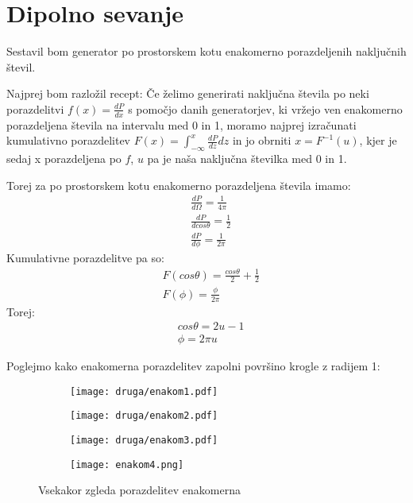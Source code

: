\documentclass{article}
\begin{document}
\section{Dipolno sevanje}

Sestavil bom generator po prostorskem kotu enakomerno porazdeljenih naključnih števil.


Najprej bom razložil recept: Če želimo generirati naključna števila po neki porazdelitvi $f(x) = \frac{dP}{dx}$ s pomočjo danih generatorjev, ki vržejo ven enakomerno porazdeljena števila na intervalu med 0 in 1, moramo najprej izračunati kumulativno porazdelitev $F(x) = \int_{-\infty}^x \frac{dP}{dz}dz$ in jo obrniti $x = F^{-1}(u)$, kjer je sedaj x porazdeljena po $f$, $u$ pa je naša naključna številka med 0 in 1.

Torej za po prostorskem kotu enakomerno porazdeljena števila imamo:
\begin{align*}
&\frac{dP}{d\Omega} = \frac{1}{4\pi} \\
&\frac{dP}{dcos\theta} = \frac{1}{2} \\
&\frac{dP}{d\phi} = \frac{1}{2\pi}
\end{align*}
Kumulativne porazdelitve pa so:
\begin{align*}
&F(cos\theta) = \frac{cos \theta}{2} + \frac{1}{2} \\
&F(\phi) = \frac{\phi}{2\pi}
\end{align*}
Torej:
\begin{align*}
&cos\theta = 2u - 1 \\
&\phi = 2\pi u 
\end{align*}

Poglejmo kako enakomerna porazdelitev zapolni površino krogle z radijem 1:
\begin{figure}[H]
\centering
\begin{subfigure}{.49\textwidth}
\texttt{[image: druga/enakom1.pdf]}
\end{subfigure}
\begin{subfigure}{.49\textwidth}
\texttt{[image: druga/enakom2.pdf]}
\end{subfigure}
\end{figure}
\begin{figure}[H]
\centering
\begin{subfigure}{.49\textwidth}
\texttt{[image: druga/enakom3.pdf]}
\end{subfigure}
\begin{subfigure}{.49\textwidth}
\texttt{[image: enakom4.png]}
\end{subfigure}
\caption*{Vsekakor zgleda porazdelitev enakomerna}
\end{figure}
\end{document}
